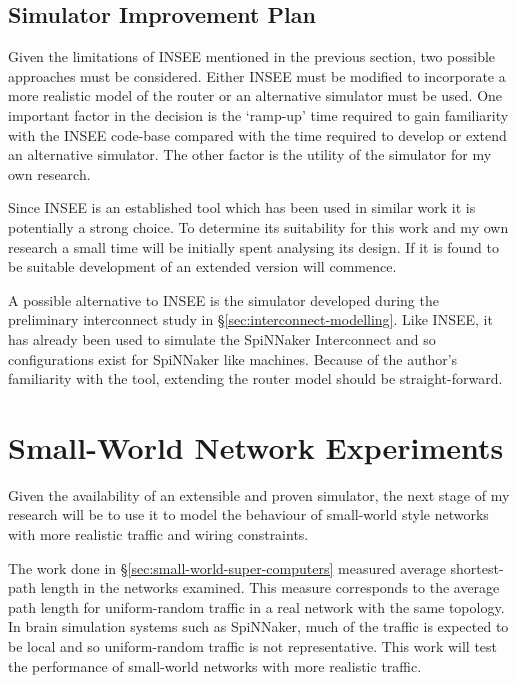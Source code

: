 		\subsection{Simulator Improvement Plan}
			
			\label{sec:simulator-improvement-plan}
			
			Given the limitations of INSEE mentioned in the previous section, two
			possible approaches must be considered. Either INSEE must be modified to
			incorporate a more realistic model of the router or an alternative
			simulator must be used.  One important factor in the decision is the
			`ramp-up' time required to gain familiarity with the INSEE code-base
			compared with the time required to develop or extend an alternative
			simulator. The other factor is the utility of the simulator for my own
			research.
			
			Since INSEE is an established tool which has been used in similar work it
			is potentially a strong choice. To determine its suitability for this work
			and my own research a small time will be initially spent analysing its
			design. If it is found to be suitable development of an extended version
			will commence.
			
			A possible alternative to INSEE is the simulator developed during the
			preliminary interconnect study in \S\ref{sec:interconnect-modelling}.
			Like INSEE, it has already been used to simulate the SpiNNaker
			Interconnect and so configurations exist for SpiNNaker like machines.
			Because of the author's familiarity with the tool, extending the router
			model should be straight-forward.
	
	
	\section{Small-World Network Experiments}
		
		Given the availability of an extensible and proven simulator, the next stage
		of my research will be to use it to model the behaviour of small-world style
		networks with more realistic traffic and wiring constraints.
		
		The work done in \S\ref{sec:small-world-super-computers} measured average
		shortest-path length in the networks examined. This measure corresponds to
		the average path length for uniform-random traffic in a real network with
		the same topology. In brain simulation systems such as SpiNNaker, much of
		the traffic is expected to be local and so uniform-random traffic is not
		representative.  This work will test the performance of small-world networks
		with more realistic traffic.
		
